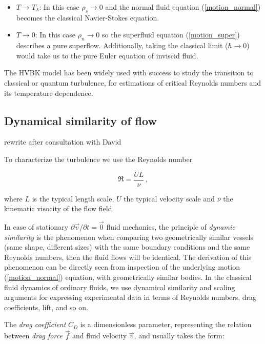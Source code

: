\begin{itemize}
	\item $T \rightarrow T_{\lambda}$: In this case $\rho_s \rightarrow 0$ and the normal fluid equation (\ref{motion_normal}) becomes the classical Navier-Stokes equation.

	\item $T \rightarrow 0$: In this case $\rho_n \rightarrow 0$ so the superfluid equation (\ref{motion_super}) describes a pure superflow. Additionally, taking the classical limit ($\hbar \rightarrow 0$) would take us to the pure Euler equation of inviscid fluid.
\end{itemize}

The HVBK model has been widely used with success to study the transition to classical or quantum turbulence, for estimations of critical Reynolds numbers and its temperature dependence.

\subsection*{Dynamical similarity of flow}

\todo rewrite after consultation with David

To characterize the turbulence we use the Reynolds number

\begin{equation}
\Re = \frac{UL}{\nu}\,,
\end{equation}

where $L$ is the typical length scale, $U$ the typical velocity scale and $\nu$ the kinematic visocity of the flow field.

In case of stationary $\partial \vec{v} / \partial t = \vec{0}$ fluid mechanics, the principle of \textit{dynamic similarity} is the phenomenon when comparing two geometrically similar vessels (same shape, different sizes) with the same boundary conditions and the same Reynolds numbers, then the fluid flows will be identical. The derivation of this phenomenon can be directly seen from inspection of the underlying motion (\ref{motion_normal}) equation, with geometrically similar bodies. In the classical fluid dynamics of ordinary fluids, we use dynamical similarity and scaling arguments for expressing experimental data in terms of Reynolds numbers, drag coefficients, lift, and so on.

The \textit{drag coefficient} $C_D$ is a dimensionless parameter, representing the relation between \textit{drag force} $\vec{f}$ and fluid velocity $\vec{v}$, and usually takes the form:

